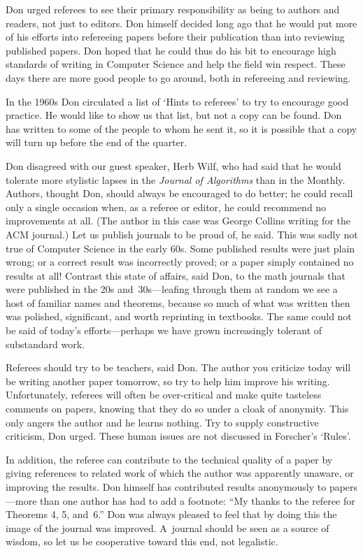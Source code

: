 Don urged referees to see their primary responsibility as being to
authors and readers, not just to editors. Don himself decided long ago
that he would put more of his efforts into refereeing papers before
their publication than into reviewing published papers. Don hoped that
he could thus do his bit to encourage high standards of writing in
Computer Science and help the field win respect. These days there are
more good people to go around, both in refereeing and reviewing.

In the 1960s Don circulated a list of `Hints to referees' to try to
encourage good practice. He would like to show us that list, but not a copy
can be found. Don has written to some of the people to whom he sent
it, so it is possible that a copy will turn up before the end of the
quarter.

Don disagreed with our guest speaker, Herb Wilf, who had said that he
would tolerate more stylistic lapses in the {\sl Journal of Algorithms\/} than
in the {\sc Monthly}. Authors, thought Don, should always be
encouraged to do better; he could recall only a single occasion when,
as a referee or editor,
 he could recommend no improvements at all. (The author in
this case was George Collins writing for the ACM journal.) Let us
publish journals to be proud of, he said. This was sadly not true of
Computer Science in the early 60s. Some published results were just
plain wrong; or a correct result was incorrectly proved; or a paper
simply contained no results at all! Contrast this state of affairs,
said Don, to the math journals that were published in the 20s and~30s---leafing
 through them at random we see a host of familiar names
and theorems, because so much of what was written then was polished,
significant, and worth reprinting in textbooks. The same could not be
said of today's efforts---perhaps we have grown increasingly tolerant
of substandard work.

Referees should try to be teachers, said Don. The author you criticize
today will be writing another paper tomorrow, so try to help him
improve his writing. Unfortunately, referees will often be
over-critical and make quite tasteless comments on papers, knowing
that they do so under a cloak of anonymity. This only angers the
author and he learns nothing. Try to supply constructive criticism,
Don urged. These human issues are not discussed in Forscher's `Rules'.

In addition, the referee can contribute to the technical quality of a
paper by giving references to related work of which the author was
apparently unaware, or improving the results.
 Don himself has contributed results anonymously
to papers---more
than one author has had to add a footnote: ``My thanks to the
referee for Theorems 4, 5, and~6.'' Don was always pleased to feel
that by doing this the image of the journal was improved. A~journal
should be seen as a source of wisdom, so let us be cooperative toward
this end, not legalistic.

